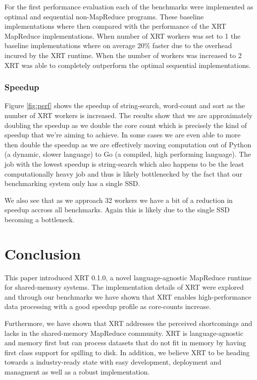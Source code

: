 \documentclass[twocolumn,11px]{article}       %
\begin{document}
For the first performance evaluation each of the benchmarks were implemented as optimal and sequential non-MapReduce programs.
These baseline implementations where then compared with the performance of the XRT MapReduce implementations.
When number of XRT workers was set to 1 the baseline implementations where on average 20\% faster due to the overhead incured by the XRT runtime.
When the number of workers was increased to 2 XRT was able to completely outperform the optimal sequential implementations.

\subsubsection{Speedup}

Figure \ref{fig:perf} shows the speedup of string-search, word-count and sort as the number of XRT workers is increased.
The results show that we are approximately doubling the speedup as we double the core count which is precisely the kind of speedup that we're aiming to achieve.
In some cases we are even able to more then double the speedup as we are effectively moving computation out of Python (a dynamic, slower language) to Go (a compiled, high performing language).
The job with the lowest speedup is string-search which also happens to be the least computationally heavy job and thus is likely bottlenecked by the fact that our benchmarking system only has a single SSD.

We also see that as we approach 32 workers we have a bit of a reduction in speedup accross all benchmarks.
Again this is likely due to the single SSD becoming a bottleneck.

\section{Conclusion} \label{sec:concl}

This paper introduced XRT 0.1.0, a novel language-agnostic MapReduce runtime for shared-memory systems.
The implementation details of XRT were explored and through our benchmarks we have shown that XRT enables high-performance data processing with a good speedup profile as core-counts increase.

Furthermore, we have shown that XRT addresses the perceived shortcomings and lacks in the shared-memory MapReduce community.
XRT is language-agnostic and memory first but can process datasets that do not fit in memory by having first class support for spilling to disk.
In addition, we believe XRT to be heading towards a industry-ready state with easy development, deployment and managment as well as a robust implementation.
\end{document}
